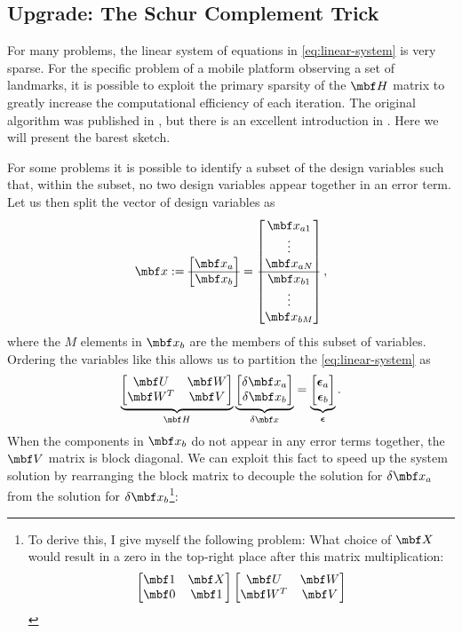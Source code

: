 \documentclass[11pt,a4,oneside]{article}
\begin{document}
\subsection{Upgrade: The Schur Complement Trick \label{ss:Schur}}
For many problems, the linear system of equations in \eqref{eq:linear-system} is very sparse. For the specific problem of a mobile platform observing a set of landmarks, it is possible to exploit the primary sparsity of the $\mbf H$ matrix to greatly increase the computational efficiency of each iteration. The original algorithm was published in \citet{brown58}, but there is an excellent introduction in \citet[Appendix 6]{Hartley0001}. Here we will present the barest sketch.

For some problems it is possible to identify a subset of the design variables such that, within the subset, no two design variables appear together in an error term. Let us then split the vector of design variables as
\begin{equation}
  \mbf x := \bbm \mbf x_a\\\hline \mbf x_b \ebm  = \bbm \mbf x_{a1} \\ \vdots \\ \mbf x_{aN} \\\hline \mbf x_{b1} \\ \vdots \\ \mbf x_{bM} \ebm,
\end{equation}
where the $M$ elements in $\mbf x_b$ are the members of this subset of variables. Ordering the variables like this allows us to partition the \eqref{eq:linear-system} as
\begin{equation}
  \label{eq:partitionA}
  \underbrace{
  \bbm 
    \mbf U   & \mbf W \\
    \mbf W^T & \mbf V 
  \ebm
  }_{\mbf H}
  \underbrace{
  \bbm
    \mbfdel x_a\\
    \mbfdel x_b
  \ebm
  }_{\mbfdel x}
  =
  \underbrace{
  \bbm
    \mbs \epsilon_a\\
    \mbs \epsilon_b
  \ebm
  }_{\mbs \epsilon}.
\end{equation}
When the components in $\mbf x_b$ do not appear in any error terms together, the $\mbf V$ matrix is block diagonal. We can exploit this fact to speed up the system solution by rearranging the block matrix to decouple the solution for $\mbfdel x_a$ from the solution for $\mbfdel x_b$\footnote{To derive this, I give myself the following problem: What choice of $\mbf X$ would result in a zero in the top-right place after this matrix multiplication:
\begin{equation*}
  \bbm
    \mbf 1 & \mbf X \\
    \mbf 0 & \mbf 1
  \ebm
  \bbm 
    \mbf U   & \mbf W \\
    \mbf W^T & \mbf V 
  \ebm
\end{equation*}
}:
\end{document}
